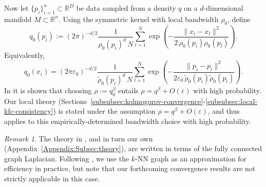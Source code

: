 \documentclass{article}
\let\todo\undefined
\let\todo\undefined
\newcommand{\todo}[1][]{}
\theoremstyle{remark}
\newtheorem{remark}{Remark}
\theoremstyle{plain}
\begin{document}
Now let $\{p_i\}_{i=1}^n \subset \mathbb{R}^D$ be data sampled from a density $q$ on a
$d$-dimensional manifold $M \subset \mathbb{R}^n$. Using the symmetric kernel with local bandwidth $\rho_0$, define
\[
q_0(p_i)
:=
(2\pi)^{-d/2}\frac{1}{\rho_0(p_i)^d\,N}
\sum_{l=1}^N
\exp\!\left(
-\frac{\|x_i-x_l\|^2}{2\,\rho_0(p_i)\rho_0(p_l)}
\right).
\]
Equivalently,
\[
q_0(x_i)
=
(2\pi\varepsilon_0)^{-d/2}\frac{1}{\widetilde{\rho}_0(p_i)^d\,N}
\sum_{l=1}^N
\exp\!\left(
-\frac{\|p_i-p_l\|^2}
{2\varepsilon_0\,\widetilde{\rho}_0(p_i)\widetilde{\rho}_0(p_l)}
\right).
\] %
In \cite{Berry2016} it is shown that choosing \( \rho := q_{0}^\beta \) entails \( \rho=q^\beta + O(\varepsilon) \) with high probability. Our local theory (Sections~\ref{subsubsec:kolmogorov-convergence}-\ref{subsubsec:local-kfc-consistency}) is stated under the assumption \( \rho=q^\beta + O(\varepsilon) \), and thus applies to this empirically-determined bandwidth choice with high probability. 

 




\begin{remark}
The theory in \cite{Berry2016}, and in turn our own (Appendix~\ref{Appendix:Subsec:theory}), are written in terms of the fully connected graph Laplacian. Following \cite{Berry2016}, we use the \( k \)-NN graph as an approximation for efficiency in practice, but note that our forthcoming convergence results are not strictly applicable in this case.
\end{remark}
\end{document}
